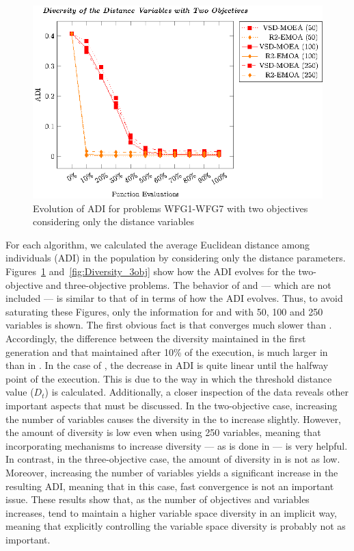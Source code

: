 \begin{figure}[t]
\centering
\includegraphics[scale=0.85]{Images/Graphic-Diversity_2obj_tikz-figure1.eps}
\caption{Evolution of ADI for problems WFG1-WFG7 with two objectives considering only the distance variables}\label{fig:Diversity_2obj}
\end{figure}

For each algorithm, we calculated the average Euclidean distance among individuals (ADI) in the population by considering only 
the distance parameters.
%
Figures~\ref{fig:Diversity_2obj} and~\ref{fig:Diversity_3obj} show how the ADI evolves for the two-objective and three-objective problems.
%
The behavior of \NSGAII{} and \MOEAD{} --- which are not included --- is similar to that of \RMOEA{} in terms of how the ADI evolves. 
%
Thus, to avoid saturating these Figures, only the information for \VSDMOEA{} and \RMOEA{} with 50, 100 and 250 variables is shown.
%
The first obvious fact is that \VSDMOEA{} converges much slower than \RMOEA{}.
%
Accordingly, the difference between the diversity maintained in the first generation and that maintained after 10\% of the execution,
is much larger in \RMOEA{} than in \VSDMOEA{}.
%
In the case of \VSDMOEA{}, the decrease in ADI is quite linear until the halfway point of the execution.
%
This is due to the way in which the threshold distance value ($D_t$) is calculated.
%
Additionally, a closer inspection of the data reveals other important aspects that must be discussed. 
%
In the two-objective case, increasing the number of variables causes the diversity in the \RMOEA{} to increase slightly.
%
However, the amount of diversity is low even when using 250 variables, meaning that incorporating mechanisms to increase diversity --- as is done in \VSDMOEA{} ---
is very helpful.
%
In contrast, in the three-objective case, the amount of diversity in \RMOEA{} is not as low.
%
Moreover, increasing the number of variables yields a significant increase in the resulting ADI, meaning that in this case,
fast convergence is not an important issue.
%
These results show that, as the number of objectives and variables increases, \MOEAS{} tend to maintain a higher variable space diversity
in an implicit way, meaning that explicitly controlling the variable space diversity is probably not as important.
%

